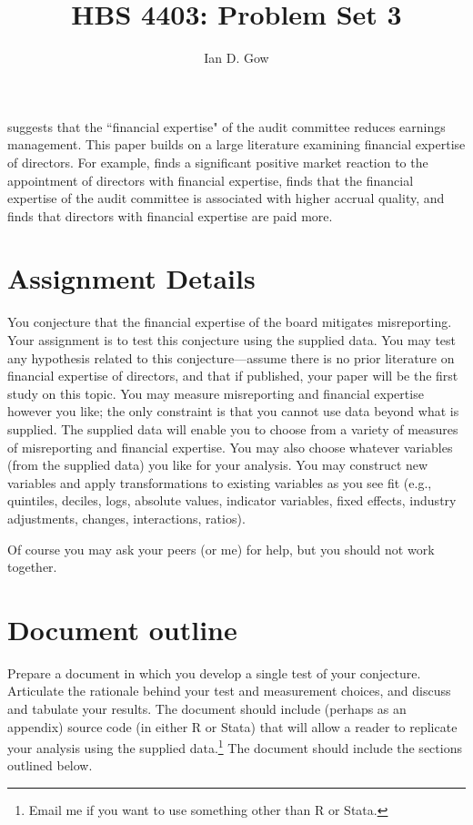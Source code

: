 \documentclass[11pt]{amsart}
\title[HBS 4403: Management Control and Performance Measurement]{HBS 4403: Problem Set 3}
\author{Ian D. Gow}
\begin{document}
\maketitle



\citet{Badolato:2014bw} suggests that the ``financial expertise" of the audit committee reduces earnings management. 
This paper builds on a large literature examining financial expertise of directors.
For example, \citet{DeFond:2005hs} finds a significant positive market reaction to the appointment of directors with financial expertise, \citet{Dhaliwal:2010bz} finds that the financial expertise of the audit committee is associated with higher accrual quality, and \citet{Engel:2010kv} finds that directors with financial expertise are paid more.

\section{Assignment Details}
You conjecture that the financial expertise of the board mitigates misreporting. 
Your assignment is to test this conjecture using the supplied data. 
You may test any hypothesis related to this conjecture---assume there is no prior literature on financial expertise of directors, and that if published, your paper will be the first study on this topic.
You may measure misreporting and financial expertise however you like; the only constraint is that you cannot use data beyond what is supplied. 
The supplied data will enable you to choose from a variety of measures of misreporting and financial expertise. 
You may also choose whatever variables (from the supplied data) you like for your analysis. 
You may construct new variables and apply transformations to existing variables as you see fit (e.g., quintiles, deciles, logs, absolute values, indicator variables, fixed effects, industry adjustments, changes, interactions, ratios). 

Of course you may ask your peers (or me) for help, but you should not work together.

\section{Document outline}
Prepare a document in which you develop a single test of your conjecture. 
Articulate the rationale behind your test and measurement choices, and discuss and tabulate your results. 
The document should include (perhaps as an appendix) source code (in either R or Stata) that will allow a reader to replicate your analysis using the supplied data.\footnote{
Email me if you want to use something other than R or Stata.}
The document should include the sections outlined below.
\end{document}
